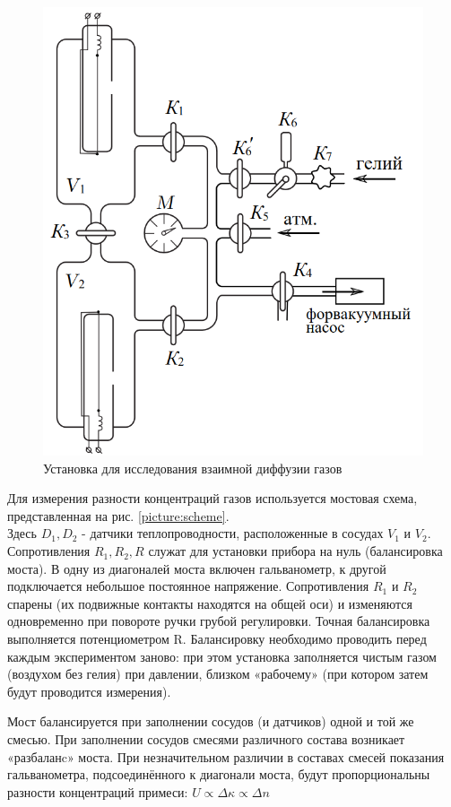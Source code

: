 \documentclass[a4paper,12pt]{article}
\begin{document}
\begin{figure}[!h]
    \centering
    \includegraphics[width=9.5 cm]{ustan_C.png}
    \caption{Установка для исследования взаимной диффузии газов}
    \label{picture:ustan}
\end{figure}

Для измерения разности концентраций газов используется мостовая схема, представленная на рис. \ref{picture:scheme}. \\

Здесь $D_1, D_2$ - датчики теплопроводности, расположенные в сосудах $V_1$ и $V_2$. Сопротивления $R_1, R_2, R$ служат для установки прибора на нуль (балансировка моста). В одну из диагоналей моста включен гальванометр, к другой подключается небольшое постоянное напряжение. Сопротивления $R_1$ и $R_2$ спарены (их подвижные контакты находятся на общей оси) и изменяются одновременно при повороте ручки грубой регулировки. Точная балансировка выполняется потенциометром R. Балансировку необходимо проводить перед каждым экспериментом заново: при этом установка заполняется чистым газом (воздухом без гелия) при давлении, близком «рабочему» (при котором затем будут проводится измерения).

Мост балансируется при заполнении сосудов (и датчиков) одной и той же смесью. При заполнении сосудов смесями различного состава возникает «разбаланc» моста. При незначительном различии в составах смесей показания гальванометра, подсоединённого к диагонали моста, будут пропорциональны разности концентраций примеси: $U \propto \Delta \kappa \propto \Delta n$
 
\end{document}
